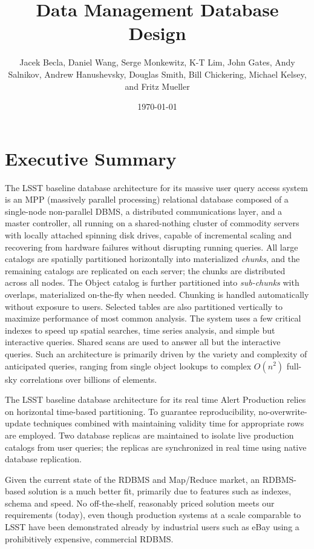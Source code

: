\documentclass[DM,lsstdraft,toc]{lsstdoc}
\title{Data Management Database Design}
\author{%
	Jacek Becla,
	Daniel Wang,
	Serge Monkewitz,
	K-T Lim,
	John Gates,
	Andy Salnikov,
	Andrew Hanushevsky,
	Douglas Smith,
	Bill Chickering,
	Michael Kelsey,
	and
	Fritz Mueller
}
\date{\today}
\begin{document}
\maketitle

\section{Executive Summary}\label{executive-summary}

The LSST baseline database architecture for its massive user query
access system is an MPP (massively parallel processing) relational
database composed of a single-node non-parallel DBMS, a distributed
communications layer, and a master controller, all running on a
shared-nothing cluster of commodity servers with locally attached
spinning disk drives, capable of incremental scaling and recovering from
hardware failures without disrupting running queries. All large catalogs
are spatially partitioned horizontally into materialized \emph{chunks},
and the remaining catalogs are replicated on each server; the chunks are
distributed across all nodes. The Object catalog is further partitioned
into \emph{sub-chunks} with overlaps, materialized on-the-fly when
needed. Chunking is handled automatically without exposure to users.
Selected tables are also partitioned vertically to maximize performance
of most common analysis. The system uses a few critical indexes to speed
up spatial searches, time series analysis, and simple but interactive
queries. Shared scans are used to answer all but the interactive
queries. Such an architecture is primarily driven by the variety and
complexity of anticipated queries, ranging from single object lookups to
complex \(O(n^2)\) full-sky correlations over billions of elements.

The LSST baseline database architecture for its real time Alert
Production relies on horizontal time-based partitioning. To guarantee
reproducibility, no-overwrite-update techniques combined with
maintaining validity time for appropriate rows are employed. Two
database replicas are maintained to isolate live production catalogs
from user queries; the replicas are synchronized in real time using
native database replication.

Given the current state of the RDBMS and Map/Reduce market, an
RDBMS-based solution is a much better fit, primarily due to features
such as indexes, schema and speed. No off-the-shelf, reasonably priced
solution meets our requirements (today), even though production systems
at a scale comparable to LSST have been demonstrated already by
industrial users such as eBay using a prohibitively expensive,
commercial RDBMS.
\end{document}
